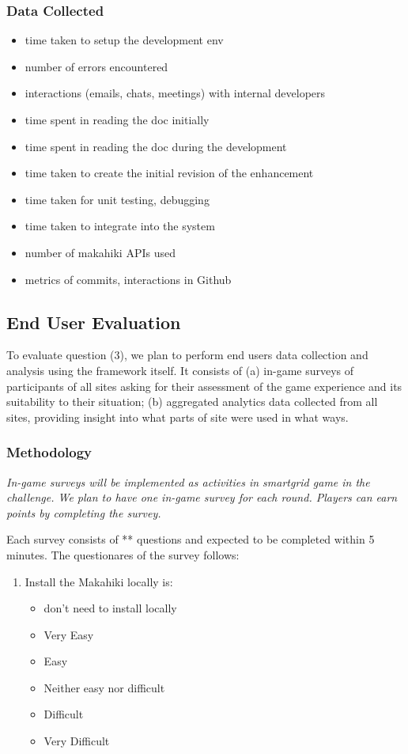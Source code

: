 \documentclass[11pt]{article}
\begin{document}
\subsubsection{Data Collected}
\begin{itemize}
 \item time taken to setup the development env
 \item number of errors encountered
 \item interactions (emails, chats, meetings) with internal developers
 \item time spent in reading the doc initially
 \item time spent in reading the doc during the development
 \item time taken to create the initial revision of the enhancement
 \item time taken for unit testing, debugging
 \item time taken to integrate into the system
 \item number of makahiki APIs used
 \item metrics of commits, interactions in Github
 
\end{itemize}

\subsection{End User Evaluation}
To evaluate question (3), we plan to perform end users data collection and analysis using the framework itself. It consists of (a) in-game surveys of participants of all sites asking for their assessment of the game experience and its suitability to their situation;
(b) aggregated analytics data collected from all sites, providing insight into what parts of site were used in what ways.

\subsubsection{Methodology}

\em In-game surveys \em will be implemented as activities in smartgrid game in the challenge. We plan to have one in-game survey for each round. Players can earn points by completing the survey.

Each survey consists of ** questions and expected to be completed within 5 minutes. The questionares of the survey follows:

\begin{enumerate}

\item Install the Makahiki locally is: 
\begin{itemize}
\item don't need to install locally
\item Very Easy
\item Easy
\item Neither easy nor difficult
\item Difficult
\item Very Difficult
\end{itemize}

\end{enumerate}
\end{document}
